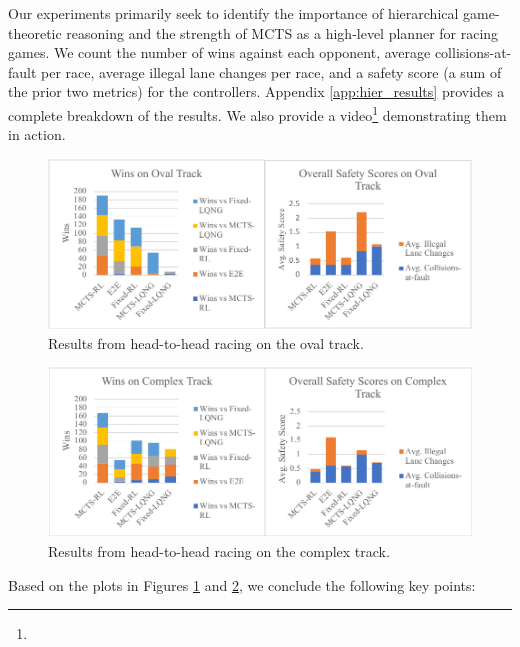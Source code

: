 Our experiments primarily seek to identify the importance of hierarchical game-theoretic reasoning and the strength of MCTS as a high-level planner for racing games. We count the number of wins against each opponent, average collisions-at-fault per race, average illegal lane changes per race, and a safety score (a sum of the prior two metrics) for the controllers. Appendix \ref{app:hier_results} provides a complete breakdown of the results. We also provide a video\footnote{\vidurl} demonstrating them in action. 
\begin{figure}
  \centering
  \includegraphics[width=\textwidth]{Figures/OvalResultsNew2.pdf}
  \caption{Results from head-to-head racing on the oval track.}
  \label{fig:results_oval}
\end{figure}
\begin{figure}
\centering
  \includegraphics[width=\textwidth]{Figures/ComplexResultsNew2.pdf}
  \caption{Results from head-to-head racing on the complex track.}
  \label{fig:results_complex}
\end{figure}

Based on the plots in Figures \ref{fig:results_oval} and \ref{fig:results_complex}, we conclude the following key points:

